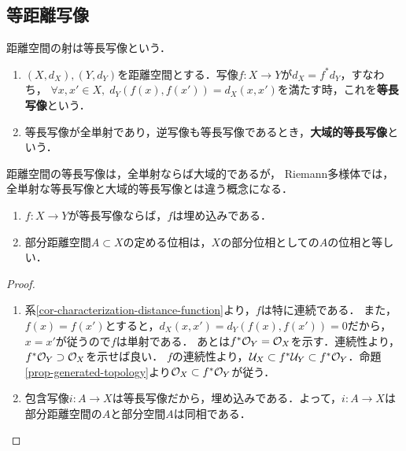 \documentclass[uplatex,dvipdfmx]{jsreport}
\begin{document}
\subsection{等距離写像}

\begin{tcolorbox}[colframe=ForestGreen, colback=ForestGreen!10!white,breakable,colbacktitle=ForestGreen!40!white,coltitle=black,fonttitle=\bfseries\sffamily,
title=]
    距離空間の射は等長写像という．
\end{tcolorbox}

\begin{definition}\mbox{}
    \begin{enumerate}
        \item $(X,d_X),(Y,d_Y)$を距離空間とする．写像$f:X\to Y$が$d_X=f^*d_Y$，すなわち，
        $\forall x,x'\in X,\; d_Y(f(x),f(x'))=d_X(x,x')$を満たす時，これを\textbf{等長写像}という．
        \item 等長写像が全単射であり，逆写像も等長写像であるとき，\textbf{大域的等長写像}という．
    \end{enumerate}
\end{definition}
\begin{remark}
    距離空間の等長写像は，全単射ならば大域的であるが，
    Riemann多様体では，全単射な等長写像と大域的等長写像とは違う概念になる．
\end{remark}

\begin{proposition}\label{prop-部分距離空間のwell-definedness}\mbox{}
    \begin{enumerate}
        \item $f:X\to Y$が等長写像ならば，$f$は埋め込みである．
        \item 部分距離空間$A\subset X$の定める位相は，$X$の部分位相としての$A$の位相と等しい．
    \end{enumerate}
\end{proposition}
\begin{proof}\mbox{}
    \begin{enumerate}
        \item 系\ref{cor-characterization-distance-function}より，$f$は特に連続である．
        また，$f(x)=f(x')$とすると，$d_X(x,x')=d_Y(f(x),f(x'))=0$だから，$x=x'$が従うので$f$は単射である．
        あとは$f^*\mathcal{O}_Y=\mathcal{O}_X$を示す．連続性より，$f^*\mathcal{O}_Y\supset\mathcal{O}_X$を示せば良い．
        $f$の連続性より，$\mathcal{U}_X\subset f^*\mathcal{U}_Y\subset f^*\mathcal{O}_Y$．命題\ref{prop-generated-topology}より$\mathcal{O}_X\subset f^*\mathcal{O}_Y$が従う．
        \item 包含写像$i:A\to X$は等長写像だから，埋め込みである．よって，$i:A\to X$は部分距離空間の$A$と部分空間$A$は同相である．
    \end{enumerate}
\end{proof}
\end{document}
